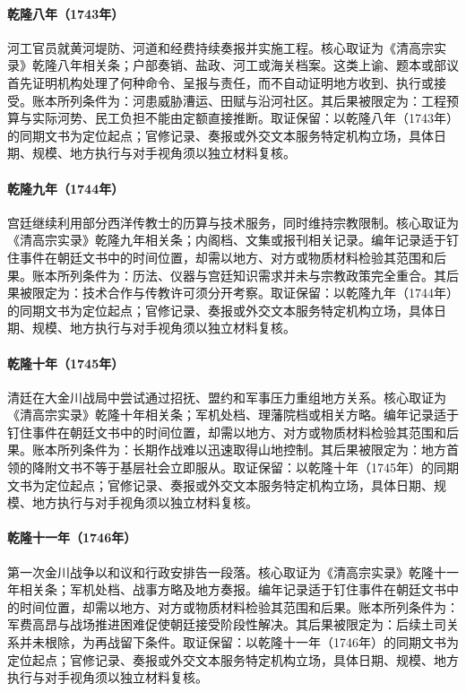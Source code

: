 \hypertarget{ledger:EQ-1743-YELLOW-RIVER-WORKS}{}\paragraph{乾隆八年（1743年）}河工官员就黄河堤防、河道和经费持续奏报并实施工程。核心取证为《清高宗实录》乾隆八年相关条；户部奏销、盐政、河工或海关档案。这类上谕、题本或部议首先证明机构处理了何种命令、呈报与责任，而不自动证明地方收到、执行或接受。账本所列条件为：河患威胁漕运、田赋与沿河社区。其后果被限定为：工程预算与实际河势、民工负担不能由定额直接推断。取证保留：以乾隆八年（1743年）的同期文书为定位起点；官修记录、奏报或外交文本服务特定机构立场，具体日期、规模、地方执行与对手视角须以独立材料复核。
\hypertarget{ledger:EQ-1744-JESUIT-CALENDAR-SERVICE}{}\paragraph{乾隆九年（1744年）}宫廷继续利用部分西洋传教士的历算与技术服务，同时维持宗教限制。核心取证为《清高宗实录》乾隆九年相关条；内阁档、文集或报刊相关记录。编年记录适于钉住事件在朝廷文书中的时间位置，却需以地方、对方或物质材料检验其范围和后果。账本所列条件为：历法、仪器与宫廷知识需求并未与宗教政策完全重合。其后果被限定为：技术合作与传教许可须分开考察。取证保留：以乾隆九年（1744年）的同期文书为定位起点；官修记录、奏报或外交文本服务特定机构立场，具体日期、规模、地方执行与对手视角须以独立材料复核。
\hypertarget{ledger:EQ-1745-JINCHUAN-NEGOTIATION}{}\paragraph{乾隆十年（1745年）}清廷在大金川战局中尝试通过招抚、盟约和军事压力重组地方关系。核心取证为《清高宗实录》乾隆十年相关条；军机处档、理藩院档或相关方略。编年记录适于钉住事件在朝廷文书中的时间位置，却需以地方、对方或物质材料检验其范围和后果。账本所列条件为：长期作战难以迅速取得山地控制。其后果被限定为：地方首领的降附文书不等于基层社会立即服从。取证保留：以乾隆十年（1745年）的同期文书为定位起点；官修记录、奏报或外交文本服务特定机构立场，具体日期、规模、地方执行与对手视角须以独立材料复核。
\hypertarget{ledger:EQ-1746-FIRST-JINCHUAN-SETTLEMENT}{}\paragraph{乾隆十一年（1746年）}第一次金川战争以和议和行政安排告一段落。核心取证为《清高宗实录》乾隆十一年相关条；军机处档、战事方略及地方奏报。编年记录适于钉住事件在朝廷文书中的时间位置，却需以地方、对方或物质材料检验其范围和后果。账本所列条件为：军费高昂与战场推进困难促使朝廷接受阶段性解决。其后果被限定为：后续土司关系并未根除，为再战留下条件。取证保留：以乾隆十一年（1746年）的同期文书为定位起点；官修记录、奏报或外交文本服务特定机构立场，具体日期、规模、地方执行与对手视角须以独立材料复核。
